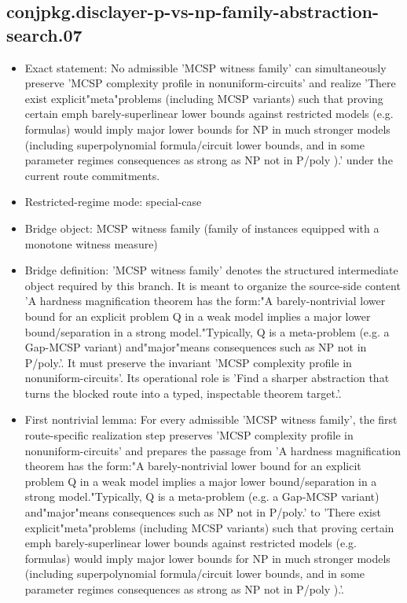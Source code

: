 \documentclass[11pt]{article}
\begin{document}
\subsection*{conjpkg.disclayer-p-vs-np-family-abstraction-search.07}
\begin{itemize}
\item Exact statement: No admissible 'MCSP witness family' can simultaneously preserve 'MCSP complexity profile in nonuniform-circuits' and realize 'There exist explicit"meta"problems (including MCSP variants) such that proving certain emph barely-superlinear lower bounds against restricted models (e.g. formulas) would imply major lower bounds for NP in much stronger models (including superpolynomial formula/circuit lower bounds, and in some parameter regimes consequences as strong as NP not in P/poly ).' under the current route commitments.
\item Restricted-regime mode: special-case
\item Bridge object: MCSP witness family (family of instances equipped with a monotone witness measure)
\item Bridge definition: 'MCSP witness family' denotes the structured intermediate object required by this branch. It is meant to organize the source-side content 'A hardness magnification theorem has the form:"A barely-nontrivial lower bound for an explicit problem Q in a weak model implies a major lower bound/separation in a strong model."Typically, Q is a meta-problem (e.g. a Gap-MCSP variant) and"major"means consequences such as NP not in P/poly.'. It must preserve the invariant 'MCSP complexity profile in nonuniform-circuits'. Its operational role is 'Find a sharper abstraction that turns the blocked route into a typed, inspectable theorem target.'.
\item First nontrivial lemma: For every admissible 'MCSP witness family', the first route-specific realization step preserves 'MCSP complexity profile in nonuniform-circuits' and prepares the passage from 'A hardness magnification theorem has the form:"A barely-nontrivial lower bound for an explicit problem Q in a weak model implies a major lower bound/separation in a strong model."Typically, Q is a meta-problem (e.g. a Gap-MCSP variant) and"major"means consequences such as NP not in P/poly.' to 'There exist explicit"meta"problems (including MCSP variants) such that proving certain emph barely-superlinear lower bounds against restricted models (e.g. formulas) would imply major lower bounds for NP in much stronger models (including superpolynomial formula/circuit lower bounds, and in some parameter regimes consequences as strong as NP not in P/poly ).'.

\end{itemize}
\end{document}
